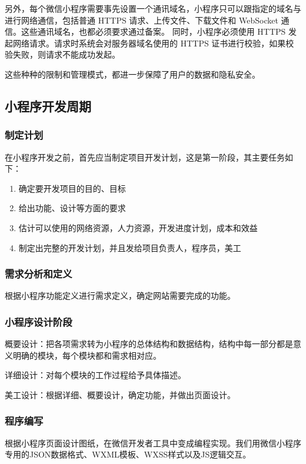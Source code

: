 \documentclass[UTF8,12pt]{ctexart}
\numberwithin{figure}{section}%
\begin{document}
\begin{spacing}{2}
另外，每个微信小程序需要事先设置一个通讯域名，小程序只可以跟指定的域名与进行网络通信，包括普通 HTTPS 请求、上传文件、下载文件和 WebSocket 通信。这些通讯域名，也都必须要求通过备案。
同时，小程序必须使用 HTTPS 发起网络请求。请求时系统会对服务器域名使用的 HTTPS 证书进行校验，如果校验失败，则请求不能成功发起。

这些种种的限制和管理模式，都进一步保障了用户的数据和隐私安全。


\subsection{小程序开发周期}

\subsubsection{制定计划}
在小程序开发之前，首先应当制定项目开发计划，这是第一阶段，其主要任务如下：
\begin{enumerate}
	\item[(1)]确定要开发项目的目的、目标
	
	\item[(2)]给出功能、设计等方面的要求
	
	\item[(3)]估计可以使用的网络资源，人力资源，开发进度计划，成本和效益
	
	\item[(4)]制定出完整的开发计划，并且发给项目负责人，程序员，美工
	
\end{enumerate}


\subsubsection{需求分析和定义}
根据小程序功能定义进行需求定义，确定网站需要完成的功能。

\subsubsection{小程序设计阶段}
概要设计：把各项需求转为小程序的总体结构和数据结构，结构中每一部分都是意义明确的模块，每个模块都和需求相对应。

详细设计：对每个模块的工作过程给予具体描述。

美工设计：根据详细、概要设计，确定功能，并做出页面设计。

\subsubsection{程序编写}
根据小程序页面设计图纸，在微信开发者工具中变成编程实现。我们用微信小程序专用的JSON数据格式、WXML模板、WXSS样式以及JS逻辑交互。


\end{spacing}
\end{document}
